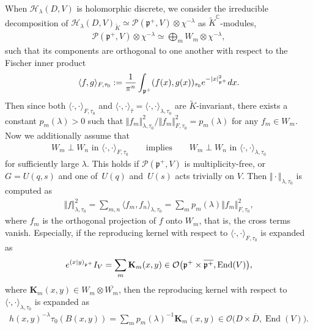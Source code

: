 \documentclass[11pt]{article}
\numberwithin{equation}{section}
\newcommand{\bK}{\mathbf{K}}
\newcommand{\BC}{\mathbb{C}}
\newcommand{\fp}{\mathfrak{p}}
\newcommand{\cH}{\mathcal{H}}
\newcommand{\cO}{\mathcal{O}}
\newcommand{\cP}{\mathcal{P}}
\newcommand{\End}{\operatorname{End}}
\begin{document}
When $\cH_\lambda(D,V)$ is holomorphic discrete, we consider the irreducible decomposition of \linebreak
$\cH_\lambda(D,V)_{\tilde{K}}\simeq \cP(\fp^+,V)\otimes \chi^{-\lambda}$ as $\tilde{K}^\BC$-modules,
\begin{gather*} \cP(\fp^+,V)\otimes \chi^{-\lambda}\simeq \bigoplus_m W_m\otimes\chi^{-\lambda}, \end{gather*}
such that its components are orthogonal to one another with respect to the Fischer inner product
\begin{gather*} \langle f,g\rangle_{F,\tau_0}:=\frac{1}{\pi^n}\int_{\fp^+} (f(x),g(x) )_{\tau_0}{\rm e}^{-|x|_{\fp^+}^2}{\rm d}x. \end{gather*}
Then since both $\langle \cdot,\cdot\rangle_{F,\tau_0}$ and
$\langle\cdot,\cdot\rangle_{\hat{\tau}}=\langle \cdot,\cdot\rangle_{\lambda,\tau_0}$ are $\tilde{K}$-invariant,
there exists a constant $p_m(\lambda)>0$ such that $\Vert f_m\Vert^2_{\lambda,\tau_0}/\Vert f_m\Vert^2_{F,\tau_0}=p_m(\lambda)$
for any $f_m\in W_m$.
Now we additionally assume that
\begin{gather}\label{assumption_orth}
W_m\perp W_n \text{ in } \langle\cdot,\cdot\rangle_{F,\tau_0}\qquad \text{implies}\qquad
W_m\perp W_n \text{ in } \langle\cdot,\cdot\rangle_{\lambda,\tau_0}
\end{gather}
for sufficiently large $\lambda$.
This holds if $\cP(\fp^+,V)$ is multiplicity-free, or $G=U(q,s)$ and one of~$U(q)$ and~$U(s)$ acts trivially on $V$.
Then $\Vert \cdot\Vert_{\lambda,\tau_0}$ is computed as
\begin{gather}\label{norm_compare}
\Vert f\Vert_{\lambda,\tau_0}^2=\sum_{m,n}\langle f_m,f_n\rangle_{\lambda,\tau_0}=\sum_m p_m(\lambda)\Vert f_m\Vert_{F,\tau_0}^2,
\end{gather}
where $f_m$ is the orthogonal projection of $f$ onto $W_m$, that is, the cross terms vanish.
Especially, if the reproducing kernel with respect to $\langle\cdot,\cdot\rangle_{F,\tau_0}$ is expanded as
\begin{gather*} {\rm e}^{(x|y)_{\fp^+}}I_V=\sum_m \bK_m(x,y)\in\cO\big(\fp^+\times\overline{\fp^+},\End(V)\big), \end{gather*}
where  $\bK_m(x,y)\in W_m\otimes\overline{W_m}$, then the reproducing kernel with respect to $\langle\cdot,\cdot\rangle_{\lambda,\tau_0}$ is expanded as
\begin{gather}\label{kernel_expansion}
h(x,y)^{-\lambda}\tau_0(B(x,y))=\sum_m p_m(\lambda)^{-1}\bK_m(x,y)\in\cO\big(D\times\overline{D},\End(V)\big).
\end{gather}
\end{document}
